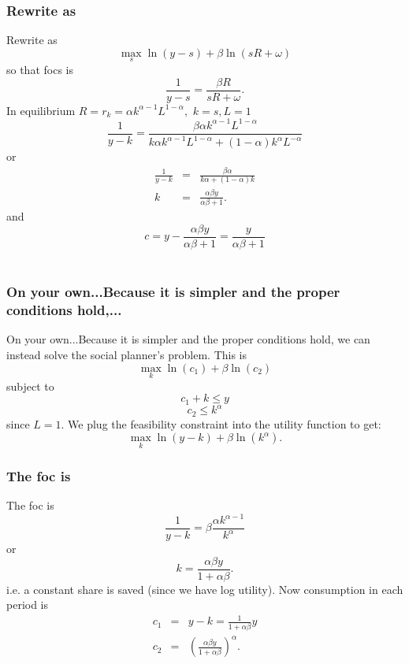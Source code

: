 \documentclass[aspectratio=169]{ltx-talk}
\begin{document}
\begin{frame}
\frametitle{Rewrite as}
Rewrite as%
\begin{equation*}
\underset{s}{\max }\ln \left( y-s\right) +\beta \ln \left( sR+\omega \right) 
\end{equation*}%
so that focs is%
\begin{equation*}
\frac{1}{y-s}=\frac{\beta R}{sR+\omega }.
\end{equation*}%
In equilibrium $R=r_{k}=\alpha k^{\alpha -1}L^{1-\alpha },$ $k=s,L=1$ 
\begin{equation*}
\frac{1}{y-k}=\frac{\beta \alpha k^{\alpha -1}L^{1-\alpha }}{k\alpha
k^{\alpha -1}L^{1-\alpha }+\left( 1-\alpha \right) k^{\alpha }L^{-\alpha }}
\end{equation*}%
or 
\begin{eqnarray*}
\frac{1}{y-k} &=&\frac{\beta \alpha }{k\alpha +\left( 1-\alpha \right) k} \\
k &=&\frac{\alpha \beta y}{\alpha \beta +1}.
\end{eqnarray*}%
and 
\begin{equation*}
c=y-\frac{\alpha \beta y}{\alpha \beta +1}=\frac{y}{\alpha \beta +1}
\end{equation*}
$\allowbreak $
\end{frame}

\begin{frame}
\frametitle{On your own...Because it is simpler and the proper conditions hold,...}
On your own...Because it is simpler and the proper conditions hold, we can
instead solve the social planner's problem. This is 
\begin{equation*}
\underset{k}{\max }\ln \left( c_{1}\right) +\beta \ln \left( c_{2}\right)
\end{equation*}%
subject to%
\begin{equation*}
c_{1}+k\leq y
\end{equation*}%
\begin{equation*}
c_{2}\leq k^{\alpha }
\end{equation*}%
since $L=1.$ We plug the feasibility constraint into the utility function to
get: 
\begin{equation*}
\underset{k}{\max }\ln \left( y-k\right) +\beta \ln \left( k^{\alpha
}\right) .
\end{equation*}
\end{frame}

\begin{frame}
\frametitle{The foc is}
The foc is 
\begin{equation*}
\frac{1}{y-k}=\beta \frac{\alpha k^{\alpha -1}}{k^{\alpha }}
\end{equation*}%
or%
\begin{equation*}
k=\frac{\alpha \beta y}{1+\alpha \beta }.
\end{equation*}%
i.e. a constant share is saved (since we have log utility). Now consumption
in each period is 
\begin{eqnarray*}
c_{1} &=&y-k=\frac{1}{1+\alpha \beta }y \\
c_{2} &=&\left( \frac{\alpha \beta y}{1+\alpha \beta }\right) ^{\alpha }.
\end{eqnarray*}
\end{frame}
\end{document}
